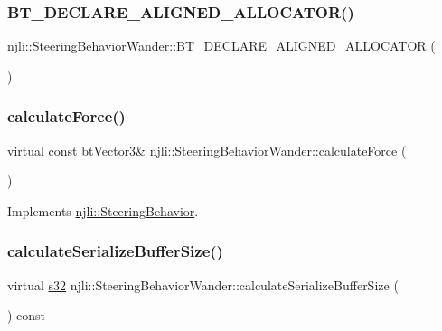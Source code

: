 \subsubsection{\texorpdfstring{B\+T\+\_\+\+D\+E\+C\+L\+A\+R\+E\+\_\+\+A\+L\+I\+G\+N\+E\+D\+\_\+\+A\+L\+L\+O\+C\+A\+T\+O\+R()}{BT\_DECLARE\_ALIGNED\_ALLOCATOR()}}
{\footnotesize\ttfamily njli\+::\+Steering\+Behavior\+Wander\+::\+B\+T\+\_\+\+D\+E\+C\+L\+A\+R\+E\+\_\+\+A\+L\+I\+G\+N\+E\+D\+\_\+\+A\+L\+L\+O\+C\+A\+T\+OR (\begin{DoxyParamCaption}{ }\end{DoxyParamCaption})\hspace{0.3cm}{\ttfamily [protected]}}

\mbox{\label{classnjli_1_1_steering_behavior_wander_ae21123cbd677526e9860730511798f1a}} 
\subsubsection{\texorpdfstring{calculate\+Force()}{calculateForce()}}
{\footnotesize\ttfamily virtual const bt\+Vector3\& njli\+::\+Steering\+Behavior\+Wander\+::calculate\+Force (\begin{DoxyParamCaption}{ }\end{DoxyParamCaption})\hspace{0.3cm}{\ttfamily [virtual]}}



Implements \mbox{\hyperlink{classnjli_1_1_steering_behavior_a9720953de1268f658636213946d76ed3}{njli\+::\+Steering\+Behavior}}.

\mbox{\label{classnjli_1_1_steering_behavior_wander_a15f9d5931b6d72abb1305cb018edbd3a}} 
\subsubsection{\texorpdfstring{calculate\+Serialize\+Buffer\+Size()}{calculateSerializeBufferSize()}}
{\footnotesize\ttfamily virtual \mbox{\hyperlink{_util_8h_aa62c75d314a0d1f37f79c4b73b2292e2}{s32}} njli\+::\+Steering\+Behavior\+Wander\+::calculate\+Serialize\+Buffer\+Size (\begin{DoxyParamCaption}{ }\end{DoxyParamCaption}) const\hspace{0.3cm}{\ttfamily [virtual]}}

